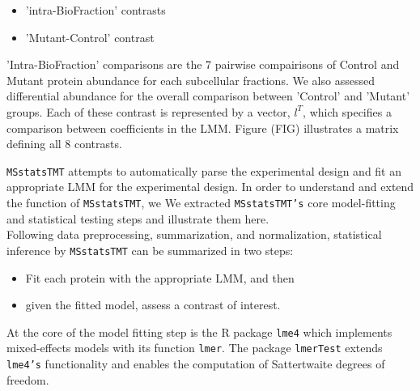 \documentclass[11pt]{elife}\usepackage[]{graphicx}\usepackage[]{color}
\begin{document}
\begin{itemize}
	\item 'intra-BioFraction' contrasts 
	\item 'Mutant-Control' contrast 
\end{itemize}

'Intra-BioFraction' comparisons are the 7 pairwise compairisons of Control and
Mutant protein abundance for each subcellular fractions. We
also assessed differential abundance for the overall comparison between 'Control'
and 'Mutant' groups. Each of these contrast is represented by a vector, $l^T$, 
which specifies a comparison between coefficients in the LMM. Figure (FIG) 
illustrates a matrix defining all 8 contrasts. 

\texttt{MSstatsTMT} attempts to automatically parse the experimental design and
fit an appropriate LMM for the experimental design.
In order to understand and extend the function of \texttt{MSstatsTMT}, we 
We extracted \texttt{MSstatsTMT's} core model-fitting and statistical testing 
steps and illustrate them here.\\

Following data preprocessing, summarization, and normalization, statistical
inference by \texttt{MSstatsTMT} can be summarized in two steps:\\

\begin{itemize}
	\item Fit each protein with the appropriate LMM, and then
	\item given the fitted model, assess a contrast of interest.
\end{itemize}
		
At the core of the model fitting step is the
R package \texttt{lme4} which implements mixed-effects models with its function
\texttt{lmer}. The package \texttt{lmerTest} extends \texttt{lme4's}
functionality and enables the computation of Sattertwaite degrees of freedom.\\
\end{document}
